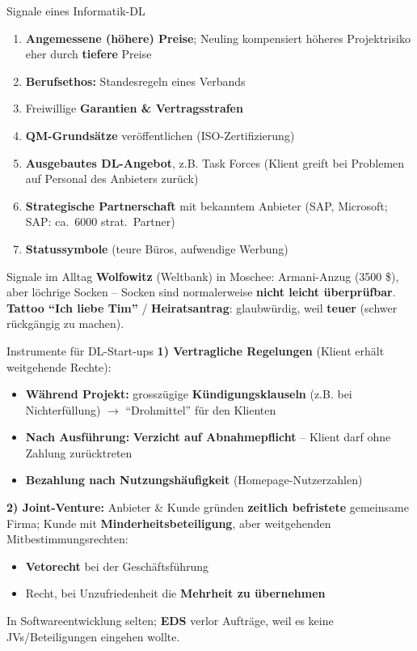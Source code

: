 \documentclass[a4paper, fontsize=7pt]{scrartcl}
\begin{document}
\begin{mainbox}{Signale eines Informatik-DL}
\begin{enumerate}
    \item \textbf{Angemessene (höhere) Preise}; Neuling kompensiert
    höheres Projektrisiko eher durch \textbf{tiefere} Preise
    \item \textbf{Berufsethos:} Standesregeln eines Verbands
    \item Freiwillige \textbf{Garantien \& Vertragsstrafen}
    \item \textbf{QM-Grundsätze} veröffentlichen (ISO-Zertifizierung)
    \item \textbf{Ausgebautes DL-Angebot}, z.B. Task Forces (Klient greift
    bei Problemen auf Personal des Anbieters zurück)
    \item \textbf{Strategische Partnerschaft} mit bekanntem Anbieter (SAP,
    Microsoft; SAP: ca.\ 6000 strat.\ Partner)
    \item \textbf{Statussymbole} (teure Büros, aufwendige Werbung)
\end{enumerate}
\end{mainbox}

\begin{subbox}{Signale im Alltag}
\textbf{Wolfowitz} (Weltbank) in Moschee: Armani-Anzug (3500 \$), aber
löchrige Socken -- Socken sind normalerweise \textbf{nicht leicht
überprüfbar}. \textbf{Tattoo ``Ich liebe Tim''} / \textbf{Heiratsantrag}:
glaubwürdig, weil \textbf{teuer} (schwer rückgängig zu machen).
\end{subbox}

\begin{mainbox}{Instrumente für DL-Start-ups}
\textbf{1) Vertragliche Regelungen} (Klient erhält weitgehende Rechte):
\begin{itemize}
    \item \textbf{Während Projekt:} grosszügige \textbf{Kündigungsklauseln}
    (z.B. bei Nichterfüllung) $\to$ ``Drohmittel'' für den Klienten
    \item \textbf{Nach Ausführung:} \textbf{Verzicht auf Abnahmepflicht}
    -- Klient darf ohne Zahlung zurücktreten
    \item \textbf{Bezahlung nach Nutzungshäufigkeit} (Homepage-Nutzerzahlen)
\end{itemize}
\textbf{2) Joint-Venture:} Anbieter \& Kunde gründen \textbf{zeitlich
befristete} gemeinsame Firma; Kunde mit \textbf{Minderheitsbeteiligung},
aber weitgehenden Mitbestimmungsrechten:
\begin{itemize}
    \item \textbf{Vetorecht} bei der Geschäftsführung
    \item Recht, bei Unzufriedenheit die \textbf{Mehrheit zu übernehmen}
\end{itemize}
In Softwareentwicklung selten; \textbf{EDS} verlor Aufträge, weil es keine
JVs/Beteiligungen eingehen wollte.
\end{mainbox}
\end{document}
